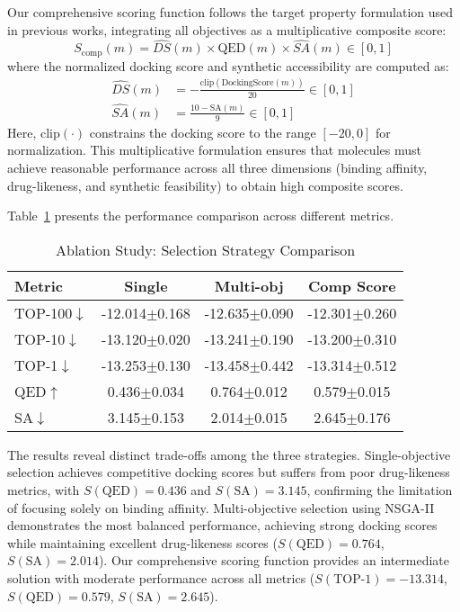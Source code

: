 \documentclass[letterpaper,journal]{IEEEtran}
\begin{document}
Our comprehensive scoring function follows the target property formulation used in previous works, integrating all objectives as a multiplicative composite score:
\begin{equation}
S_{\text{comp}}(m) =  \widehat{DS}(m) \times \text{QED}(m) \times \widehat{SA}(m) \in [0,1]
\end{equation}
where the normalized docking score and synthetic accessibility are computed as:
\begin{align}
\widehat{DS}(m) &= -\frac{\text{clip}(\text{DockingScore}(m))}{20} \in [0,1] \\
\widehat{SA}(m) &= \frac{10 - \text{SA}(m)}{9} \in [0,1]
\end{align}
Here, $\text{clip}(\cdot)$ constrains the docking score to the range $[-20, 0]$ for normalization. This multiplicative formulation ensures that molecules must achieve reasonable performance across all three dimensions (binding affinity, drug-likeness, and synthetic feasibility) to obtain high composite scores.

Table~\ref{tab:selection_ablation} presents the performance comparison across different metrics.

\begin{table}[!t]
    \caption{Ablation Study: Selection Strategy Comparison}
    \label{tab:selection_ablation}
    \centering    
    \small
    \setlength{\tabcolsep}{4pt}
    
    \begin{tabular}{l c c c}
        \hline\hline
        Metric & Single & Multi-obj & Comp Score \\
        \hline
        TOP-100$\downarrow$ & -12.014$\pm$0.168 & -12.635$\pm$0.090 & -12.301$\pm$0.260 \\
        TOP-10$\downarrow$ & -13.120$\pm$0.020 & -13.241$\pm$0.190 & -13.200$\pm$0.310 \\
        TOP-1$\downarrow$ & -13.253$\pm$0.130 & -13.458$\pm$0.442 & -13.314$\pm$0.512 \\
        QED$\uparrow$ & 0.436$\pm$0.034 & 0.764$\pm$0.012 & 0.579$\pm$0.015 \\
        SA$\downarrow$ & 3.145$\pm$0.153 & 2.014$\pm$0.015 & 2.645$\pm$0.176 \\
        \hline\hline
    \end{tabular}
\end{table}

The results reveal distinct trade-offs among the three strategies. Single-objective selection achieves competitive docking scores but suffers from poor drug-likeness metrics, with $S(\text{QED}) = 0.436$ and $S(\text{SA}) = 3.145$, confirming the limitation of focusing solely on binding affinity. Multi-objective selection using NSGA-II demonstrates the most balanced performance, achieving strong docking scores while maintaining excellent drug-likeness scores ($S(\text{QED}) = 0.764$, $S(\text{SA}) = 2.014$). Our comprehensive scoring function provides an intermediate solution with moderate performance across all metrics ($S(\text{TOP-1}) = -13.314$, $S(\text{QED}) = 0.579$, $S(\text{SA}) = 2.645$).
\end{document}
